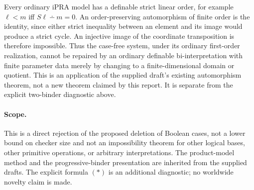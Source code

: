 Every ordinary iPRA model has a definable strict linear order, for example
$\ell<m$ iff $S\ell\mathbin{\dotminus}m=0$. An order-preserving
automorphism of finite order is the identity, since either strict
inequality between an element and its image would produce a strict
cycle. An injective image of the coordinate transposition is therefore
impossible. Thus the case-free system, under its ordinary first-order
realization, cannot be repaired by an ordinary definable bi-interpretation
with finite parameter data merely by changing to a finite-dimensional
domain or quotient. This is an application of the supplied draft's
existing automorphism theorem, not a new theorem claimed by this report.
It is separate from the explicit two-binder diagnostic above.

\paragraph{Scope.}
This is a direct rejection of the proposed deletion of Boolean cases,
not a lower bound on checker size and not an impossibility theorem for
other logical bases, other primitive operations, or arbitrary
interpretations. The product-model method and the progressive-binder
presentation are inherited from the supplied drafts. The explicit
formula $(*)$ is an additional diagnostic; no worldwide novelty claim
is made.
